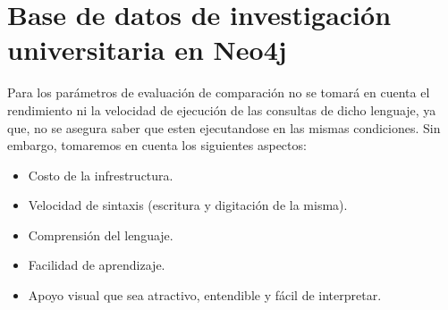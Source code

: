 \section{Base de datos de investigación universitaria en Neo4j}
Para los parámetros de evaluación de comparación no se tomará en cuenta el rendimiento ni la velocidad de ejecución de las consultas de dicho lenguaje, ya que, no se asegura saber que esten ejecutandose en las mismas condiciones.
Sin embargo, tomaremos en cuenta los siguientes aspectos:
\begin{itemize}
    \item Costo de la infrestructura.
    \item Velocidad de sintaxis (escritura y digitación de la misma).
    \item Comprensión del lenguaje.
    \item Facilidad de aprendizaje.
    \item Apoyo visual que sea atractivo, entendible y fácil de interpretar.
\end{itemize}
